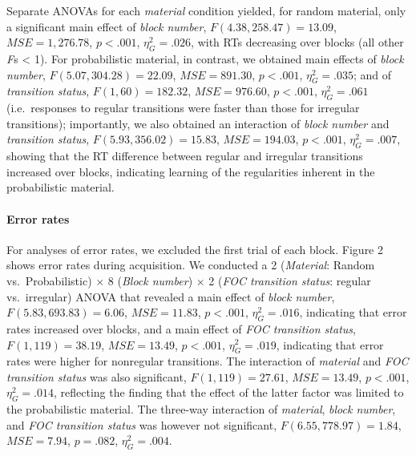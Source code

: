 \documentclass[floatsintext,man]{apa6}
\begin{document}
Separate ANOVAs for each \emph{material} condition yielded, for random
material, only a significant main effect of \emph{block number},
\(F(4.38, 258.47) = 13.09\), \(\mathit{MSE} = 1,276.78\), \(p < .001\),
\(\eta^2_G = .026\), with RTs decreasing over blocks (all other
\emph{F}s \textless{} 1). For probabilistic material, in contrast, we
obtained main effects of \emph{block number},
\(F(5.07, 304.28) = 22.09\), \(\mathit{MSE} = 891.30\), \(p < .001\),
\(\eta^2_G = .035\); and of \emph{transition status},
\(F(1, 60) = 182.32\), \(\mathit{MSE} = 976.60\), \(p < .001\),
\(\eta^2_G = .061\) (i.e.~responses to regular transitions were faster
than those for irregular transitions); importantly, we also obtained an
interaction of \emph{block number} and \emph{transition status},
\(F(5.93, 356.02) = 15.83\), \(\mathit{MSE} = 194.03\), \(p < .001\),
\(\eta^2_G = .007\), showing that the RT difference between regular and
irregular transitions increased over blocks, indicating learning of the
regularities inherent in the probabilistic material.

\paragraph{Error rates}\label{error-rates}



For analyses of error rates, we excluded the first trial of each block.
Figure 2 shows error rates during acquisition. We conducted a 2
(\emph{Material}: Random vs.~Probabilistic) \(\times\) 8 (\emph{Block
number}) \(\times\) 2 (\emph{FOC transition status}: regular
vs.~irregular) ANOVA that revealed a main effect of \emph{block number},
\(F(5.83, 693.83) = 6.06\), \(\mathit{MSE} = 11.83\), \(p < .001\),
\(\eta^2_G = .016\), indicating that error rates increased over blocks,
and a main effect of \emph{FOC transition status},
\(F(1, 119) = 38.19\), \(\mathit{MSE} = 13.49\), \(p < .001\),
\(\eta^2_G = .019\), indicating that error rates were higher for
nonregular transitions. The interaction of \emph{material} and \emph{FOC
transition status} was also significant, \(F(1, 119) = 27.61\),
\(\mathit{MSE} = 13.49\), \(p < .001\), \(\eta^2_G = .014\), reflecting
the finding that the effect of the latter factor was limited to the
probabilistic material. The three-way interaction of \emph{material},
\emph{block number}, and \emph{FOC transition status} was however not
significant, \(F(6.55, 778.97) = 1.84\), \(\mathit{MSE} = 7.94\),
\(p = .082\), \(\eta^2_G = .004\).
\end{document}
